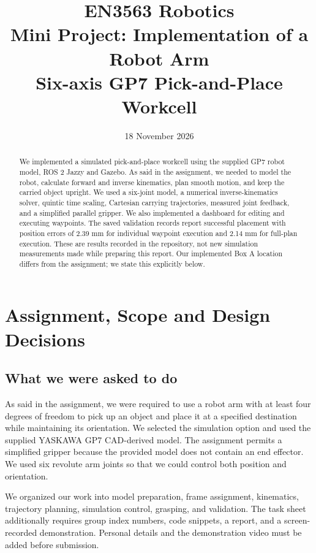 \documentclass[11pt,a4paper]{report}
\title{EN3563 Robotics\\Mini Project: Implementation of a Robot Arm\\\large Six-axis GP7 Pick-and-Place Workcell}
\author{\edit{Group member names and index numbers}}
\date{18 November 2026}
\begin{document}
\maketitle
\begin{abstract}
We implemented a simulated pick-and-place workcell using the supplied GP7 robot model, ROS 2 Jazzy and Gazebo. As said in the assignment, we needed to model the robot, calculate forward and inverse kinematics, plan smooth motion, and keep the carried object upright. We used a six-joint model, a numerical inverse-kinematics solver, quintic time scaling, Cartesian carrying trajectories, measured joint feedback, and a simplified parallel gripper. We also implemented a dashboard for editing and executing waypoints. The saved validation records report successful placement with position errors of 2.39 mm for individual waypoint execution and 2.14 mm for full-plan execution. These are results recorded in the repository, not new simulation measurements made while preparing this report. Our implemented Box A location differs from the assignment; we state this explicitly below.
\end{abstract}
\tableofcontents
\chapter{Assignment, Scope and Design Decisions}
\section{What we were asked to do}
As said in the assignment, we were required to use a robot arm with at least four degrees of freedom to pick up an object and place it at a specified destination while maintaining its orientation. We selected the simulation option and used the supplied YASKAWA GP7 CAD-derived model. The assignment permits a simplified gripper because the provided model does not contain an end effector. We used six revolute arm joints so that we could control both position and orientation.

We organized our work into model preparation, frame assignment, kinematics, trajectory planning, simulation control, grasping, and validation. The task sheet additionally requires group index numbers, code snippets, a report, and a screen-recorded demonstration. Personal details and the demonstration video must be added before submission.
\end{document}
